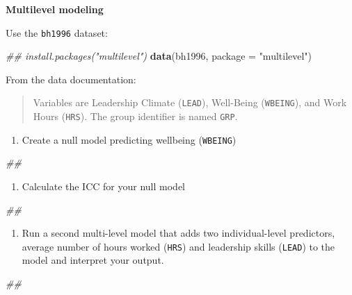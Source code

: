 \documentclass[
]{book}
\newenvironment{Shaded}{\begin{snugshade}}{\end{snugshade}}
\newcommand{\CommentTok}[1]{\textcolor[rgb]{0.56,0.35,0.01}{\textit{#1}}}
\newcommand{\DataTypeTok}[1]{\textcolor[rgb]{0.13,0.29,0.53}{#1}}
\newcommand{\KeywordTok}[1]{\textcolor[rgb]{0.13,0.29,0.53}{\textbf{#1}}}
\newcommand{\NormalTok}[1]{#1}
\newcommand{\StringTok}[1]{\textcolor[rgb]{0.31,0.60,0.02}{#1}}
\providecommand{\tightlist}{%
  \setlength{\itemsep}{0pt}\setlength{\parskip}{0pt}}
\begin{document}
\textbf{Multilevel modeling}

Use the \texttt{bh1996} dataset:

\begin{Shaded}
\begin{Highlighting}[]
\CommentTok{\#\# install.packages("multilevel")}
\KeywordTok{data}\NormalTok{(bh1996, }\DataTypeTok{package =} \StringTok{"multilevel"}\NormalTok{)}
\end{Highlighting}
\end{Shaded}

From the data documentation:

\begin{quote}
Variables are Leadership Climate (\texttt{LEAD}), Well-Being (\texttt{WBEING}), and Work Hours (\texttt{HRS}). The group identifier is named \texttt{GRP}.
\end{quote}

\begin{enumerate}
\def\labelenumi{\arabic{enumi}.}
\tightlist
\item
  Create a null model predicting wellbeing (\texttt{WBEING})
\end{enumerate}

\begin{Shaded}
\begin{Highlighting}[]
\CommentTok{\#\# }
\end{Highlighting}
\end{Shaded}

\begin{enumerate}
\def\labelenumi{\arabic{enumi}.}
\setcounter{enumi}{1}
\tightlist
\item
  Calculate the ICC for your null model
\end{enumerate}

\begin{Shaded}
\begin{Highlighting}[]
\CommentTok{\#\# }
\end{Highlighting}
\end{Shaded}

\begin{enumerate}
\def\labelenumi{\arabic{enumi}.}
\setcounter{enumi}{2}
\tightlist
\item
  Run a second multi-level model that adds two individual-level predictors, average number of hours worked (\texttt{HRS}) and leadership skills (\texttt{LEAD}) to the model and interpret your output.
\end{enumerate}

\begin{Shaded}
\begin{Highlighting}[]
\CommentTok{\#\# }
\end{Highlighting}
\end{Shaded}
\end{document}
